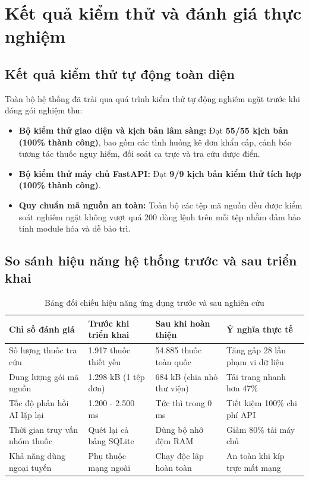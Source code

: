 \documentclass[12pt,a4paper]{article}
\begin{document}
\section{Kết quả kiểm thử và đánh giá thực nghiệm}

\subsection{Kết quả kiểm thử tự động toàn diện}
Toàn bộ hệ thống đã trải qua quá trình kiểm thử tự động nghiêm ngặt trước khi đóng gói nghiệm thu:
\begin{itemize}[leftmargin=1.5em]
    \item \textbf{Bộ kiểm thử giao diện và kịch bản lâm sàng:} Đạt \textbf{55/55 kịch bản (100\% thành công)}, bao gồm các tình huống kê đơn khẩn cấp, cảnh báo tương tác thuốc nguy hiểm, đối soát ca trực và tra cứu dược điển.
    \item \textbf{Bộ kiểm thử máy chủ FastAPI:} Đạt \textbf{9/9 kịch bản kiểm thử tích hợp (100\% thành công)}.
    \item \textbf{Quy chuẩn mã nguồn an toàn:} Toàn bộ các tệp mã nguồn đều được kiểm soát nghiêm ngặt không vượt quá 200 dòng lệnh trên mỗi tệp nhằm đảm bảo tính module hóa và dễ bảo trì.
\end{itemize}

\subsection{So sánh hiệu năng hệ thống trước và sau triển khai}

\vspace{0.2cm}
\begin{table}[h!]
\centering
\small
\begin{tabularx}{\textwidth}{L{3.6cm} L{3.0cm} L{3.0cm} Y}
\toprule
\textbf{Chỉ số đánh giá} & \textbf{Trước khi triển khai} & \textbf{Sau khi hoàn thiện} & \textbf{Ý nghĩa thực tế} \\
\midrule
Số lượng thuốc tra cứu & 1.917 thuốc thiết yếu & 54.885 thuốc toàn quốc & Tăng gấp 28 lần phạm vi dữ liệu \\
Dung lượng gói mã nguồn & 1.298 kB (1 tệp đơn) & 684 kB (chia nhỏ thư viện) & Tải trang nhanh hơn 47\% \\
Tốc độ phản hồi AI lặp lại & 1.200 - 2.500 ms & Tức thì trong 0 ms & Tiết kiệm 100\% chi phí API \\
Thời gian truy vấn nhóm thuốc & Quét lại cả bảng SQLite & Dùng bộ nhớ đệm RAM & Giảm 80\% tải máy chủ \\
Khả năng dùng ngoại tuyến & Phụ thuộc mạng ngoài & Chạy độc lập hoàn toàn & An toàn khi kíp trực mất mạng \\
\bottomrule
\end{tabularx}
\caption{Bảng đối chiếu hiệu năng ứng dụng trước và sau nghiên cứu}
\end{table}
\end{document}

